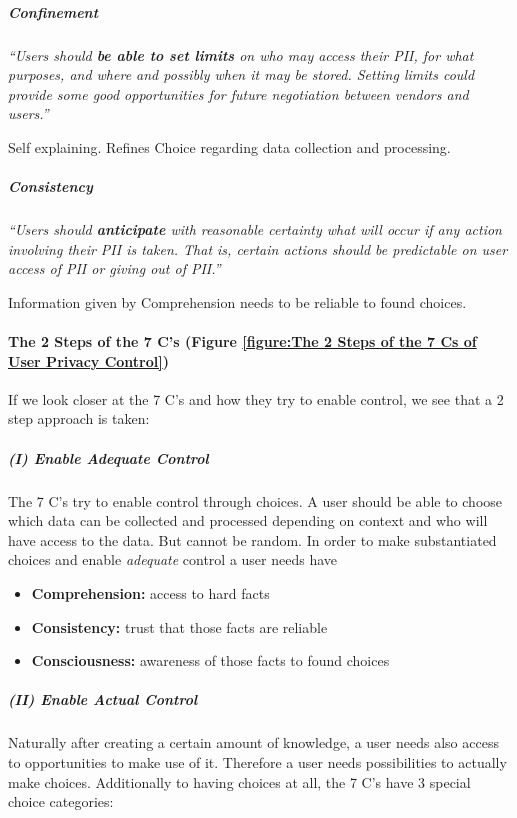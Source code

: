 \subparagraph{Confinement}

\emph{``Users should \textbf{be able to set limits} on who may access
their PII, for what purposes, and where and possibly when it may be
stored. Setting limits could provide some good opportunities for future
negotiation between vendors and users.''}

Self explaining. Refines Choice regarding data collection and
processing.

\subparagraph{Consistency}

\emph{``Users should \textbf{anticipate} with reasonable certainty what
will occur if any action involving their PII is taken. That is, certain
actions should be predictable on user access of PII or giving out of
PII.''}

Information given by Comprehension needs to be reliable to found
choices.

\paragraph{The 2 Steps of the 7 C's (Figure \ref{figure:The 2 Steps of the 7 Cs of User Privacy Control})}

If we look closer at the 7 C's and how they try to enable control, we
see that a 2 step approach is taken:



\subparagraph{(I) Enable \emph{Adequate} Control}

The 7 C's try to enable control through choices. A user should be able
to choose which data can be collected and processed depending on context
and who will have access to the data. But cannot be random. In order to
make substantiated choices and enable \emph{adequate} control a user
needs have

\begin{itemize}

\item
  \textbf{Comprehension:} access to hard facts
\item
  \textbf{Consistency:} trust that those facts are reliable
\item
  \textbf{Consciousness:} awareness of those facts to found choices
\end{itemize}

\subparagraph{(II) Enable \emph{Actual} Control}

Naturally after creating a certain amount of knowledge, a user needs
also access to opportunities to make use of it. Therefore a user needs
possibilities to actually make choices. Additionally to having choices at
all, the 7 C's have 3 special choice categories:

